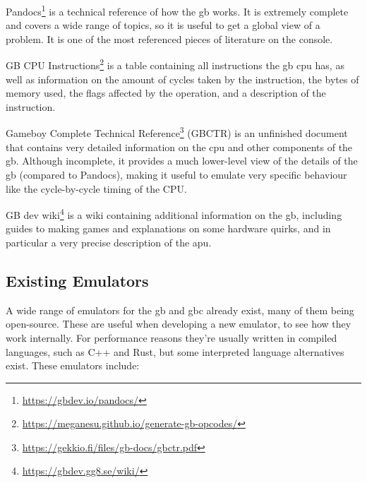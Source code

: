 \documentclass[11pt]{report}
\newcommand{\ftnt}[1]{\footnote{\url{#1}}}
\begin{document}
\begin{compactitem}
    \item Pandocs\ftnt{https://gbdev.io/pandocs/} is a technical reference of how the \gls{gb} works. It is extremely complete and covers a wide range of topics, so it is useful to get a global view of a problem. It is one of the most referenced pieces of literature on the console.
    \item GB CPU Instructions\ftnt{https://meganesu.github.io/generate-gb-opcodes/} is a table containing all instructions the \gls{gb} \gls{cpu} has, as well as information on the amount of cycles taken by the instruction, the bytes of memory used, the flags affected by the operation, and a description of the instruction.
    \item Gameboy Complete Technical Reference\ftnt{https://gekkio.fi/files/gb-docs/gbctr.pdf} (GBCTR) is an unfinished document that contains very detailed information on the \gls{cpu} and other components of the \gls{gb}. Although incomplete, it provides a much lower-level view of the details of the \gls{gb} (compared to Pandocs), making it useful to emulate very specific behaviour like the cycle-by-cycle timing of the CPU.
    \item GB dev wiki\ftnt{https://gbdev.gg8.se/wiki/} is a wiki containing additional information on the \gls{gb}, including guides to making games and explanations on some hardware quirks, and in particular a very precise description of the \gls{apu}.
\end{compactitem}

\subsection{Existing Emulators}

A wide range of emulators for the \gls{gb} and \gls{gbc} already exist, many of them being open-source. These are useful when developing a new emulator, to see how they work internally. For performance reasons they're usually written in compiled languages, such as C++ and Rust, but some interpreted language alternatives exist. These emulators include:
\end{document}
